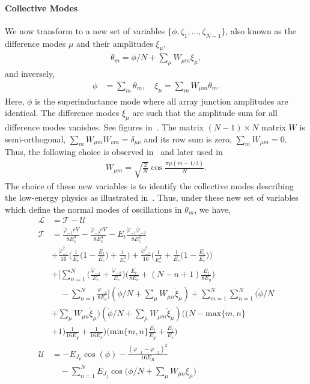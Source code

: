 \documentclass[%
reprint,
superscriptaddress,
 amsmath,amssymb,
 aps,
 prx,
longbibliography,
floatfix,
]{revtex4-2}
\begin{document}
\paragraph{Collective Modes} 
We now transform to a new set of variables $\{\phi,\zeta_1,...,\zeta_{N-1}\}$, also known as the difference modes $\mu$ and their amplitudes $\xi_\mu$,
\begin{align}
    \theta_m=\phi/N+\sum_\mu W_{\mu m}\xi_\mu,
\end{align}
and inversely,
\begin{align}
    \phi&=\sum_{m}\theta_m,\quad \xi_\mu=\sum_m W_{\mu m}\theta_m.
\end{align}
Here, $\phi$ is the superinductance mode where all array junction amplitudes are identical. The difference modes $\xi_\mu$ are such that the amplitude sum for all difference modes vanishes. See figures in~\cite{ferguson2013symmetries}. The matrix $(N-1)\times N$ matrix $W$ is semi-orthogonal, $\sum_m W_{\mu m}W_{\nu m}=\delta_{\mu \nu}$ and its row sum is zero, $\sum_mW_{\mu m}=0$. Thus, the following choice is observed in~\cite{ferguson2013symmetries} and later used in~\cite{viola2015collective}
\begin{align}
    W_{\mu m}=\sqrt{\frac{2}{N}}\cos{\frac{\pi\mu(m-1/2)}{N}}.
\end{align}
The choice of these new variables is to identify the collective modes describing the low-energy physics as illustrated in~\cite{catelani2011relaxation,koch2009charging,manucharyan2009fluxonium}. Thus, under these new set of variables which define the normal modes of oscillations in $\theta_m$, we have,
\begin{align}
    \mathcal{L}&=\mathcal{T}-\mathcal{U}\\
    \mathcal{T}&=\frac{\dot{\varphi}_{-1}eV}{8E_c^3}-\frac{\dot{\varphi}_{-2}eV}{8E_c^4}-E_t\frac{\dot{\varphi}_{-1}\dot{\varphi}_{-2}}{8E_c^2}\nonumber\\
    &+\frac{\dot{\varphi}^2_{-1}}{16}\Big(\frac{1}{E_c}\Big(1-\frac{E_t}{E_c}\Big)+\frac{1}{E_c^3}\Big)+\frac{\dot{\varphi}^2_{-2}}{16}\Big(\frac{1}{E_c^4}+\frac{1}{E_c}\Big(1-\frac{E_t}{E_c}\Big)\Big)\nonumber\\
      &+\Big[\sum_{n=1}^N\Big(\frac{\dot{\varphi}_{-1}}{E_c}+\frac{\dot{\varphi}_{-2}}{E_c}\Big)\Big(\frac{E_t}{8E_c}+(N-n+1)\frac{E_t}{8E_g}\Big)\nonumber\\&\quad-\sum_{n=1}^N\frac{\dot{\varphi}_{-2}}{8E_c}\Big](\dot{\phi}/N+\sum_\mu W_{\mu n}\dot{\xi}_\mu)+\sum_{m=1}^N\sum_{n=1}^N(\dot{\phi}/N\nonumber\\
  &+\sum_\mu W_{\mu n}\dot{\xi}_\mu)(\dot{\phi}/N+\sum_\mu W_{\mu m}\dot{\xi}_\mu)\Big( (N-\text{max}\{m,n\}\nonumber\\&+1)\frac{1}{16E_g}+\frac{1}{16E_c}\Big)\Big(\text{min}\{m,n\}\frac{E_t}{E_g}+\frac{E_t}{E_c}\Big)\label{eq:kin-energy}\\
    \mathcal{U}&=-E_{J_p}\cos(\phi)-\frac{(\varphi_{-1}-\varphi_{-2})^2}{16E_{R}}\nonumber\\&\quad-\sum_{n=1}^NE_{J_j}\cos\Big(\phi/N+\sum_\mu W_{\mu n}\xi_\mu\Big)\label{eq:pot-energy}
\end{align}
\end{document}
